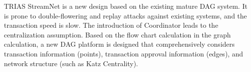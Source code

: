 TRIAS StreamNet is a new design based on the existing mature DAG system. It is prone to double-flowering and replay attacks against existing systems, and the transaction speed is slow. The introduction of Coordinator leads to the centralization assumption. Based on the flow chart calculation in the graph calculation, a new DAG platform is designed that comprehensively considers transaction information (points), transaction approval information (edges), and network structure (such as Katz Centrality).

